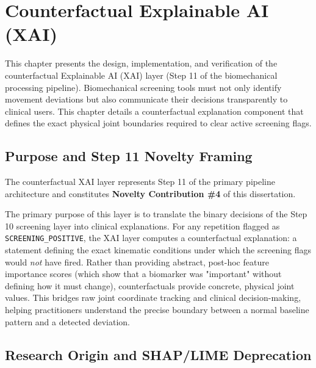 \chapter{Counterfactual Explainable AI (XAI)}
\label{ch:xai}



This chapter presents the design, implementation, and verification of the counterfactual Explainable AI (XAI) layer (Step 11 of the biomechanical processing pipeline). Biomechanical screening tools must not only identify movement deviations but also communicate their decisions transparently to clinical users. This chapter details a counterfactual explanation component that defines the exact physical joint boundaries required to clear active screening flags.



\section{Purpose and Step 11 Novelty Framing}
\label{sec:12-1-purpose-and-step-11-novelty-framing}


The counterfactual XAI layer represents Step 11 of the primary pipeline architecture and constitutes \textbf{Novelty Contribution \protect\#4} of this dissertation.

The primary purpose of this layer is to translate the binary decisions of the Step 10 screening layer into clinical explanations. For any repetition flagged as \texttt{SCREENING\_POSITIVE}, the XAI layer computes a counterfactual explanation: a statement defining the exact kinematic conditions under which the screening flags would \textit{not} have fired. Rather than providing abstract, post-hoc feature importance scores (which show that a biomarker was "important" without defining how it must change), counterfactuals provide concrete, physical joint values. This bridges raw joint coordinate tracking and clinical decision-making, helping practitioners understand the precise boundary between a normal baseline pattern and a detected deviation.



\section{Research Origin and SHAP/LIME Deprecation}
\label{sec:12-2-research-origin-and-shap-lime-deprecation}


